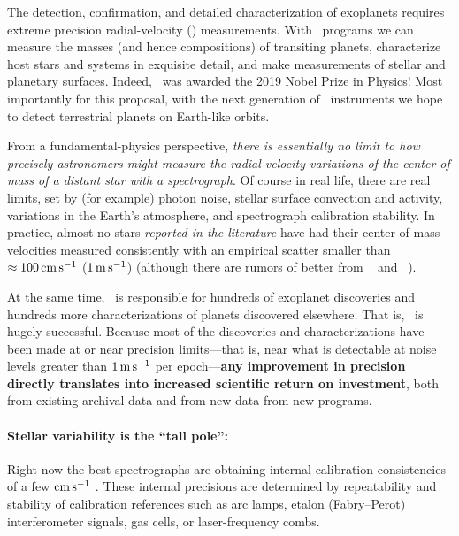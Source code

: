 \documentclass[12pt, letterpaper]{article}
\begin{document}
\sloppy\sloppypar\raggedbottom\frenchspacing

\noindent
The detection, confirmation, and detailed characterization of exoplanets
requires extreme precision radial-velocity (\EPRV)
measurements.
With \EPRV\ programs we can measure the 
masses (and hence compositions) of transiting planets,
characterize host stars and systems in exquisite detail,
and make measurements of stellar and planetary surfaces.
Indeed, \EPRV\ was awarded the 2019 Nobel Prize in Physics!
Most importantly for this proposal, with the next generation of \EPRV\ 
instruments we hope to detect terrestrial planets on Earth-like orbits.

From a fundamental-physics perspective, \emph{there is essentially no limit to how
precisely astronomers might measure the radial velocity variations
of the center of mass of a distant star with a spectrograph}.
Of course in real life, there are real limits, set
by (for example) photon noise, stellar surface convection and activity,
variations in the Earth's atmosphere, and spectrograph calibration stability.
In practice, almost no stars \emph{reported in the literature}
have had their center-of-mass
velocities measured consistently with an empirical scatter
smaller than $\approx 100\,{\mathrm{cm\,s^{-1}}}$ 
($1\,{\mathrm{m\,s^{-1}}}$) (although there are rumors of better from  \ESPRESSO\ \citep{Pepe2010} and \EXPRES\ \citep{Jurgenson2016}).

At the same time, \EPRV\ is responsible for hundreds of \foreign{ab
initio} exoplanet discoveries and hundreds more  characterizations of planets discovered elsewhere.
That is, \EPRV\ is hugely successful.
Because most of the discoveries and characterizations have been made
at or near precision limits---that is, near what is detectable at noise levels
greater than $1\,{\mathrm{m\,s^{-1}}}$ per epoch---\textbf{any improvement in precision directly
translates into increased scientific return on investment},
both from existing archival data and from new data from new programs.

\paragraph{Stellar variability is the ``tall pole'':}
Right now the best spectrographs are obtaining internal calibration
consistencies of a few ${\mathrm{cm\,s^{-1}}}$ \citep{espresso-eprv4, expres-eprv4}.
These internal precisions are determined by repeatability and
stability of calibration references such as arc lamps, etalon
(Fabry--Perot) interferometer signals, gas cells, or laser-frequency
combs.
\end{document}
